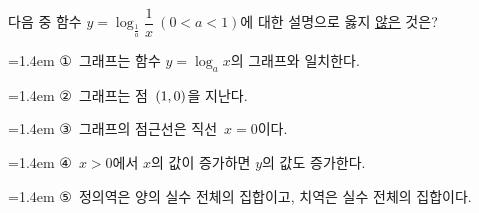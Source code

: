 다음 중 함수 $y=\log_{\frac{1}{a}} \dfrac{1}{x}\ (0<a<1)$에 대한 설명으로 옳지 \underline{않은} 것은?
\par\medskip\par\noindent\hangindent=1.4em {\small ①}\ 그래프는 함수 $y=\log_a x$의 그래프와 일치한다.\par\noindent\hangindent=1.4em {\small ②}\ 그래프는 점~$(1{,}\mkern3mu\mathopen{}0)$을 지난다.\par\noindent\hangindent=1.4em {\small ③}\ 그래프의 점근선은 직선~$x=0$이다.\par\noindent\hangindent=1.4em {\small ④}\ $x>0$에서 $x$의 값이 증가하면 $y$의 값도 증가한다.\par\noindent\hangindent=1.4em {\small ⑤}\ 정의역은 양의 실수 전체의 집합이고, 치역은 실수 전체의 집합이다.\par\medskip

